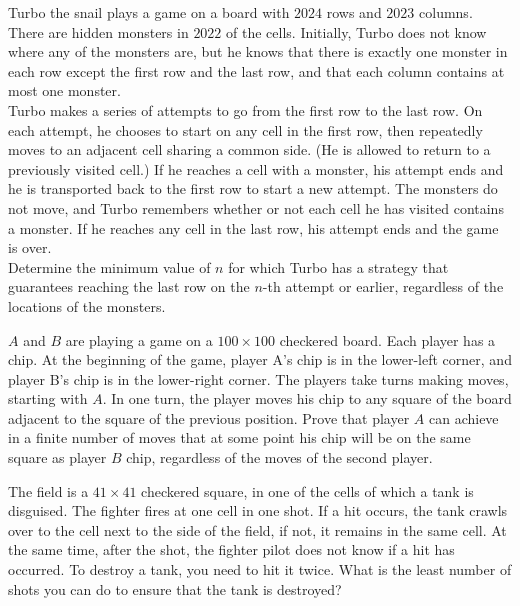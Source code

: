 \begin{problem} [IMO 2024]
    Turbo the snail plays a game on a board with $2024$ rows and $2023$ columns. There are hidden monsters in $2022$ of the cells. Initially, Turbo does not know where any of the monsters are, but he knows that there is exactly one monster in each row except the first row and the last row, and that each column contains at most one monster.\\
    Turbo makes a series of attempts to go from the first row to the last row. On each attempt, he chooses to start on any cell in the first row, then repeatedly moves to an adjacent cell sharing a common side. (He is allowed to return to a previously visited cell.) If he reaches a cell with a monster, his attempt ends and he is transported back to the first row to start a new attempt. The monsters do not move, and Turbo remembers whether or not each cell he has visited contains a monster. If he reaches any cell in the last row, his attempt ends and the game is over.\\
    Determine the minimum value of $n$ for which Turbo has a strategy that guarantees reaching the last row on the $n$-th attempt or earlier, regardless of the locations of the monsters.
\end{problem}

\begin{problem} 
    $A$ and $B$ are playing a game on a $100 \times 100$ checkered board. Each player has a chip. At the beginning of the game, player A's chip is in the lower-left corner, and player B's chip is in the lower-right corner. The players take turns making moves, starting with $A$. In one turn, the player moves his chip to any square of the board adjacent to the square of the previous position. Prove that player $A$ can achieve in a finite number of moves that at some point his chip will be on the same square as player $B$ chip, regardless of the moves of the second player.
\end{problem}

\begin{problem} 
    The field is a $41 \times 41$ checkered square, in one of the cells of which a tank is disguised. The fighter fires at one cell in one shot. If a hit occurs, the tank crawls over to the cell next to the side of the field, if not, it remains in the same cell. At the same time, after the shot, the fighter pilot does not know if a hit has occurred. To destroy a tank, you need to hit it twice. What is the least number of shots you can do to ensure that the tank is destroyed?
\end{problem}

